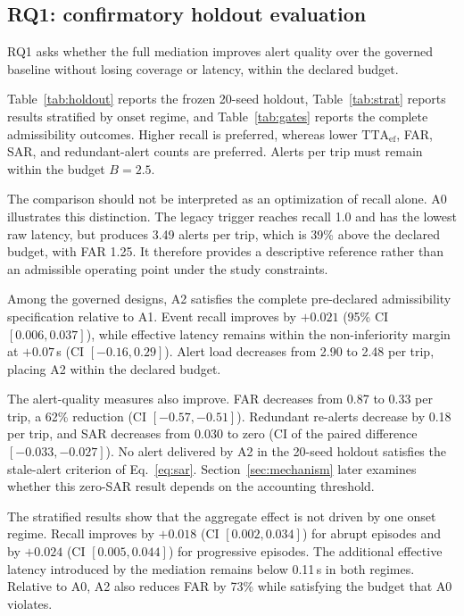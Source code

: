 \documentclass[conference]{IEEEtran}
\newcommand{\ttaef}{\mathrm{TTA}_{\mathrm{ef}}}
\begin{document}
\subsection{RQ1: confirmatory holdout evaluation}

RQ1 asks whether the full mediation improves alert quality over the
governed baseline without losing coverage or latency, within the
declared budget.

Table~\ref{tab:holdout} reports the frozen 20-seed holdout,
Table~\ref{tab:strat} reports results stratified by onset regime, and
Table~\ref{tab:gates} reports the complete admissibility outcomes.
Higher recall is preferred, whereas lower $\ttaef$, FAR, SAR, and
redundant-alert counts are preferred. Alerts per trip must remain within
the budget $B{=}2.5$.

The comparison should not be interpreted as an optimization of recall
alone. A0 illustrates this distinction. The legacy trigger reaches recall
1.0 and has the lowest raw latency, but produces 3.49 alerts per trip,
which is 39\% above the declared budget, with FAR 1.25. It therefore
provides a descriptive reference rather than an admissible operating
point under the study constraints.

Among the governed designs, A2 satisfies the complete pre-declared
admissibility specification relative to A1. Event recall improves by
$+0.021$ (95\% CI $[0.006,0.037]$), while effective latency remains within
the non-inferiority margin at $+0.07$\,s
(CI $[-0.16,0.29]$). Alert load decreases from 2.90 to 2.48 per trip,
placing A2 within the declared budget.

The alert-quality measures also improve. FAR decreases from 0.87 to
0.33 per trip, a 62\% reduction
(CI $[-0.57,-0.51]$). Redundant re-alerts decrease by 0.18 per trip, and
SAR decreases from 0.030 to zero
(CI of the paired difference $[-0.033,-0.027]$). No alert delivered by
A2 in the 20-seed holdout satisfies the stale-alert criterion of
Eq.~\eqref{eq:sar}. Section~\ref{sec:mechanism} later examines whether
this zero-SAR result depends on the accounting threshold.

The stratified results show that the aggregate effect is not driven by
one onset regime. Recall improves by $+0.018$
(CI $[0.002,0.034]$) for abrupt episodes and by $+0.024$
(CI $[0.005,0.044]$) for progressive episodes. The additional effective
latency introduced by the mediation remains below 0.11\,s in both
regimes. Relative to A0, A2 also reduces FAR by 73\% while satisfying the
budget that A0 violates.
\end{document}
